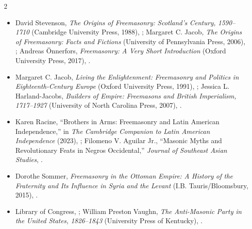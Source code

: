 \begin{multicols}{2}
{\footnotesize
\begin{itemize}[itemsep=0.1em,topsep=0.15em]
\item David Stevenson, \emph{The Origins of Freemasonry: Scotland's Century, 1590--1710} (Cambridge University Press, 1988), ; Margaret C. Jacob, \emph{The Origins of Freemasonry: Facts and Fictions} (University of Pennsylvania Press, 2006), ; Andreas Önnerfors, \emph{Freemasonry: A Very Short Introduction} (Oxford University Press, 2017), .
\item Margaret C. Jacob, \emph{Living the Enlightenment: Freemasonry and Politics in Eighteenth-Century Europe} (Oxford University Press, 1991), ; Jessica L. Harland-Jacobs, \emph{Builders of Empire: Freemasons and British Imperialism, 1717--1927} (University of North Carolina Press, 2007), .
\item Karen Racine, “Brothers in Arms: Freemasonry and Latin American Independence,” in \emph{The Cambridge Companion to Latin American Independence} (2023), ; Filomeno V. Aguilar Jr., “Masonic Myths and Revolutionary Feats in Negros Occidental,” \emph{Journal of Southeast Asian Studies}, .
\item Dorothe Sommer, \emph{Freemasonry in the Ottoman Empire: A History of the Fraternity and Its Influence in Syria and the Levant} (I.B. Tauris/Bloomsbury, 2015), .
\item Library of Congress, ; William Preston Vaughn, \emph{The Anti-Masonic Party in the United States, 1826--1843} (University Press of Kentucky), .

\end{itemize}}
\end{multicols}
